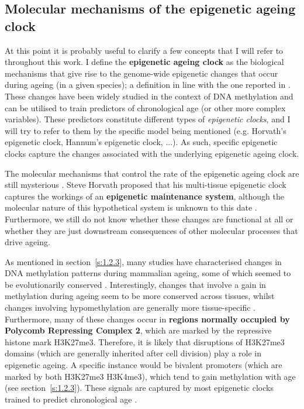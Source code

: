 \smallskip

\subsection{Molecular mechanisms of the epigenetic ageing clock} \label{s:1.3.3}

\smallskip

At this point it is probably useful to clarify a few concepts that I will refer to throughout this work. I define the \textbf{epigenetic ageing clock} as the biological mechanisms that give rise to the genome-wide epigenetic changes that occur during ageing (in a given species); a definition in line with the one reported in \cite{Horvath2018}. These changes have been widely studied in the context of DNA methylation and can be utilised to train predictors of chronological age (or other more complex variables). These predictors constitute different types of \textit{epigenetic clocks}, and I will try to refer to them by the specific model being mentioned (e.g. Horvath's epigenetic clock, Hannum's epigenetic clock, ...). As such, specific epigenetic clocks capture the changes associated with the underlying epigenetic ageing clock.

\bigskip

The molecular mechanisms that control the rate of the epigenetic ageing clock are still mysterious \cite{Horvath2018,Field2018}. Steve Horvath proposed that his multi-tissue epigenetic clock captures the workings of an \textbf{epigenetic maintenance system}, although the molecular nature of this hypothetical system is unknown to this date \cite{Horvath2013}. Furthermore, we still do not know whether these changes are functional at all or whether they are just downstream consequences of other molecular processes that drive ageing. 

\bigskip

As mentioned in section~\ref{s:1.2.3}, many studies have characterised changes in DNA methylation patterns during mammalian ageing, some of which seemed to be evolutionarily conserved \cite{Lowe2018,Horvath2013}. Interestingly, changes that involve a gain in methylation during ageing seem to be more conserved across tissues, whilst changes involving hypomethylation are generally more tissue-specific \cite{Horvath2013,Yang2016}. Furthermore, many of these changes occur in \textbf{regions normally occupied by Polycomb Repressing Complex 2}, which are marked by the repressive histone mark H3K27me3. Therefore, it is likely that disruptions of H3K27me3 domains (which are generally inherited after cell division) play a role in epigenetic ageing. A specific instance would be bivalent promoters (which are marked by both H3K27me3 H3K4me3), which tend to gain methylation with age (see section~\ref{s:1.2.3}). These signals are captured by most epigenetic clocks trained to predict chronological age \cite{Horvath2018}.

